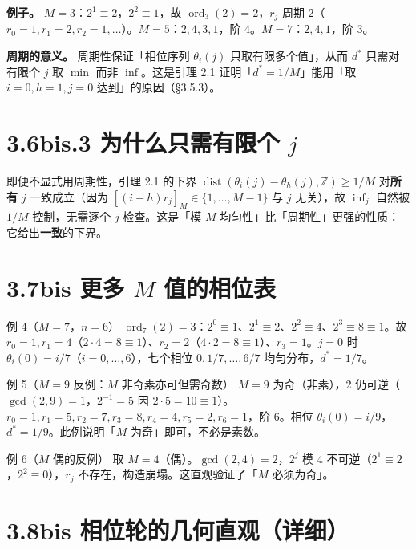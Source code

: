 \documentclass[a4paper,11pt,openany]{ctexbook}
\numberwithin{equation}{chapter}
\numberwithin{figure}{chapter}
\numberwithin{table}{chapter}
\begin{document}
\textbf{例子。} $M=3$：$2^1\equiv2$，$2^2\equiv1$，故 $\operatorname{ord}_3(2)=2$，$r_j$ 周期 $2$（$r_0=1,r_1=2,r_2=1,\dots$）。$M=5$：$2,4,3,1$，阶 $4$。$M=7$：$2,4,1$，阶 $3$。

\textbf{周期的意义。} 周期性保证「相位序列 $\theta_i(j)$ 只取有限多个值」，从而 $d^*$ 只需对有限个 $j$ 取 $\min$ 而非 $\inf$。这是引理 2.1 证明「$d^*=1/M$」能用「取 $i=0,h=1,j=0$ 达到」的原因（§3.5.3）。

\section{3.6bis.3 为什么只需有限个 $j$}

即便不显式用周期性，引理 2.1 的下界 $\operatorname{dist}(\theta_i(j)-\theta_h(j),\mathbb Z)\ge1/M$ 对\textbf{所有} $j$ 一致成立（因为 $[(i-h)r_j]_M\in\{1,\dots,M-1\}$ 与 $j$ 无关），故 $\inf_j$ 自然被 $1/M$ 控制，无需逐个 $j$ 检查。这是「模 $M$ 均匀性」比「周期性」更强的性质：它给出\textbf{一致}的下界。

\section{3.7bis 更多 $M$ 值的相位表}

\begin{examplebox}{例 4（$M=7$，$n=6$）}
$\operatorname{ord}_7(2)=3$：$2^0\equiv1$、$2^1\equiv2$、$2^2\equiv4$、$2^3\equiv8\equiv1$。故 $r_0=1,r_1=4$（$2\cdot4=8\equiv1$）、$r_2=2$（$4\cdot2=8\equiv1$）、$r_3=1$。$j=0$ 时 $\theta_i(0)=i/7$（$i=0,\dots,6$），七个相位 $0,1/7,\dots,6/7$ 均匀分布，$d^*=1/7$。
\end{examplebox}

\begin{examplebox}{例 5（$M=9$ 反例：$M$ 非奇素亦可但需奇数）}
$M=9$ 为奇（非素），$2$ 仍可逆（$\gcd(2,9)=1$，$2^{-1}=5$ 因 $2\cdot5=10\equiv1$）。$r_0=1,r_1=5,r_2=7,r_3=8,r_4=4,r_5=2,r_6=1$，阶 $6$。相位 $\theta_i(0)=i/9$，$d^*=1/9$。此例说明「$M$ 为奇」即可，不必是素数。
\end{examplebox}

\begin{examplebox}{例 6（$M$ 偶的反例）}
取 $M=4$（偶）。$\gcd(2,4)=2$，$2^j$ 模 $4$ 不可逆（$2^1\equiv2$，$2^2\equiv0$），$r_j$ 不存在，构造崩塌。这直观验证了「$M$ 必须为奇」。
\end{examplebox}

\section{3.8bis 相位轮的几何直观（详细）}
\end{document}
